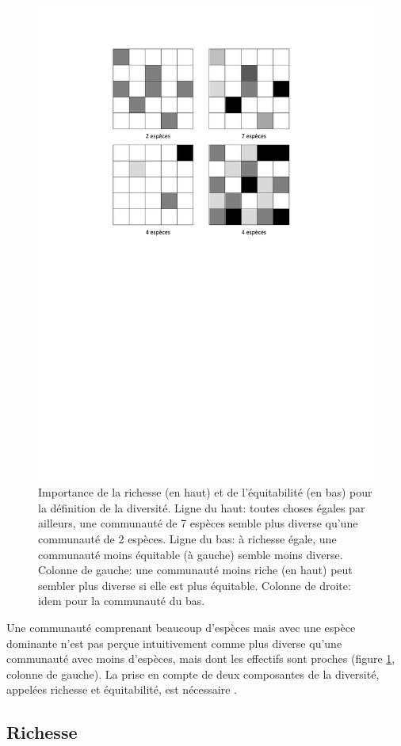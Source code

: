 \documentclass[
  11pt,
  american,
  a4paper,
  extrafontsizes,onecolumn,openright
  ]{memoir}
\begin{document}
\begin{figure}

{\centering \includegraphics[width=0.6\linewidth]{images/Composantes} 

}

\caption{Importance de la richesse (en haut) et de l'équitabilité (en bas) pour la définition de la diversité. Ligne du haut: toutes choses égales par ailleurs, une communauté de 7 espèces semble plus diverse qu'une communauté de 2 espèces. Ligne du bas: à richesse égale, une communauté moins équitable (à gauche) semble moins diverse. Colonne de gauche: une communauté moins riche (en haut) peut sembler plus diverse si elle est plus équitable. Colonne de droite: idem pour la communauté du bas.}\label{fig:Composantes}
\end{figure}

\normalsize

Une communauté comprenant beaucoup d'espèces mais avec une espèce dominante n'est pas perçue intuitivement comme plus diverse qu'une communauté avec moins d'espèces, mais dont les effectifs sont proches (figure \ref{fig:Composantes}, colonne de gauche).
La prise en compte de deux composantes de la diversité, appelées richesse et équitabilité, est nécessaire \autocite{Whittaker1965}.

\hypertarget{richesse}{%
\subsection{Richesse}\label{richesse}}
\end{document}
